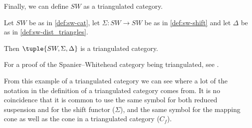Finally, we can define \( SW \) as a triangulated category.

\begin{example}
    Let \( SW \) be as in \autoref{def:sw-cat}, let \( \Sigma: SW \to SW \) be as in \autoref{def:sw-shift} and let \( \Delta \) be as in \autoref{def:sw-dist_triangles}.

    Then \( \tuple{SW, \Sigma, \Delta} \) is a triangulated category.
\end{example}

For a proof of the Spanier--Whitehead category being triangulated, see \cite[Theorem 5.9]{Daria_Bachelor}.

From this example of a triangulated category we can see where a lot of the notation in the definition of a triangulated category comes from. It is no coincidence that it is common to use the same symbol for both reduced suspension and for the shift functor (\( \Sigma \)), and the same symbol for the mapping cone as well as the cone in a triangulated category (\( C_f \)).
